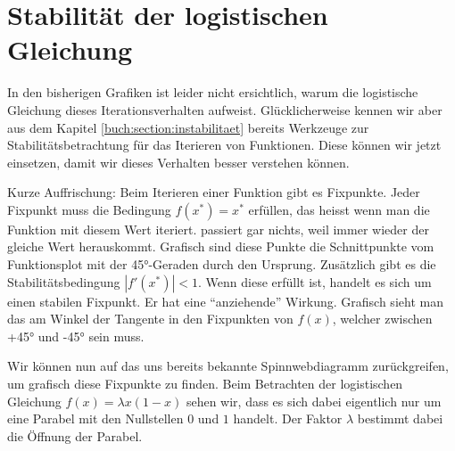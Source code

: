 %
%
%
\section{Stabilität der logistischen Gleichung
\label{logistic:section:problemstellung}}

In den bisherigen Grafiken ist leider nicht ersichtlich, 
warum die logistische Gleichung dieses Iterationsverhalten aufweist. 
Glücklicherweise kennen wir aber aus dem Kapitel \ref{buch:section:instabilitaet}
bereits Werkzeuge zur Stabilitätsbetrachtung für
das Iterieren von Funktionen. 
Diese können wir jetzt einsetzen, damit wir dieses
Verhalten besser verstehen können. 

Kurze Auffrischung: Beim Iterieren einer Funktion
gibt es Fixpunkte. 
Jeder Fixpunkt muss die Bedingung
$f(x^*)=x^*$ erfüllen, das heisst wenn man die Funktion
mit diesem Wert iteriert. passiert gar nichts, weil
immer wieder der gleiche Wert herauskommt. 
Grafisch sind diese Punkte die Schnittpunkte
vom Funktionsplot mit der 45°-Geraden durch den Ursprung.  
Zusätzlich gibt es die Stabilitätsbedingung 
$|f'(x^*)| < 1$. 
Wenn diese erfüllt ist, handelt es sich um einen
stabilen Fixpunkt. 
Er hat eine ``anziehende'' Wirkung. 
Grafisch sieht man das am Winkel der Tangente in den
Fixpunkten von $f(x)$, welcher zwischen +45° und -45° sein muss.

Wir können nun auf das uns bereits bekannte Spinnwebdiagramm
zurückgreifen, um grafisch diese Fixpunkte zu finden.
Beim Betrachten der logistischen Gleichung 
$f(x) = \lambda x (1-x)$ sehen wir, 
dass es sich dabei eigentlich nur um eine Parabel mit 
den Nullstellen $0$ und $1$ handelt. 
Der Faktor $\lambda$ bestimmt dabei die Öffnung der Parabel.  

